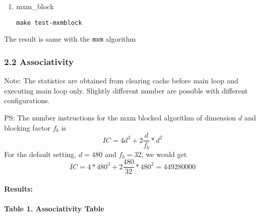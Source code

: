 \documentclass[11pt]{article}
\begin{document}
\begin{enumerate}
\def\labelenumi{(\arabic{enumi})}
\setcounter{enumi}{2}
\item
  mxm\_block

\begin{verbatim}
make test-mxmblock
\end{verbatim}
\end{enumerate}

The result is same with the \texttt{mxm} algorithm

    \subsubsection{2.2 Associativity}\label{associativity}

Note: The statistics are obtained from clearing cache before main loop
and executing main loop only. Slightly different number are possible
with different configurations.

PS: The number instructions for the mxm blocked algorithm of dimension
\(d\) and blocking factor \(f_b\) is \[IC=4d^3+2\frac{d}{f_b}*d^2\] For
the default setting, \(d=480\) and \(f_b=32\), we would get
\[IC=4*480^3+2\frac{480}{32}*480^2=449280000\]

\paragraph{Results:}\label{results}

\paragraph{Table 1. Associativity
Table}\label{table-1.-associativity-table}
\end{document}
